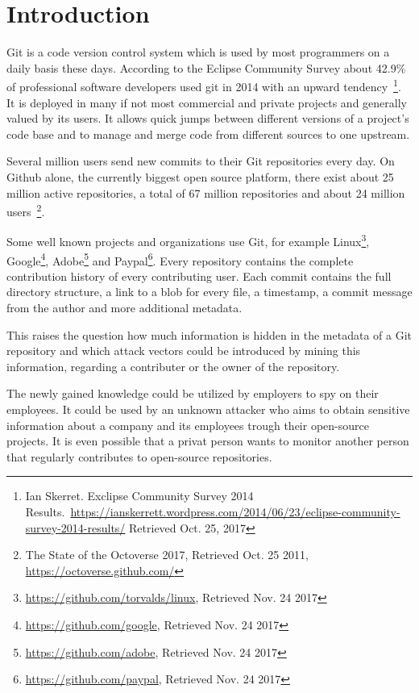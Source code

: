 \chapter{Introduction}

Git is a code version control system which is used by most programmers on a daily basis these days. According to the Eclipse Community Survey about 42.9\% of professional software developers used git in 2014 with an upward tendency~\footnote{Ian Skerret. Exclipse Community Survey 2014 Results.\ \url{https://ianskerrett.wordpress.com/2014/06/23/eclipse-community-survey-2014-results/} Retrieved Oct. 25, 2017}.
It is deployed in many if not most commercial and private projects and generally valued by its users. It allows quick jumps between different versions of a project's code base and to manage and merge code from different sources to one upstream.

Several million users send new commits to their Git repositories every day.
On Github alone, the currently biggest open source platform, there exist about 25 million active repositories, a total of 67 million repositories and about 24 million users~\footnote{The State of the Octoverse 2017, Retrieved Oct. 25 2011, \url{https://octoverse.github.com/}}.

Some well known projects and organizations use Git, for example Linux\footnote{\url{https://github.com/torvalds/linux}, Retrieved Nov. 24 2017}, Google\footnote{\url{https://github.com/google}, Retrieved Nov. 24 2017}, Adobe\footnote{\url{https://github.com/adobe}, Retrieved Nov. 24 2017} and Paypal\footnote{\url{https://github.com/paypal}, Retrieved Nov. 24 2017}.
Every repository contains the complete contribution history of every contributing user.
Each commit contains the full directory structure, a link to a blob for every file, a timestamp, a commit message from the author and more additional metadata.

This raises the question how much information is hidden in the metadata of a Git repository and which attack vectors could be introduced by mining this information, regarding a contributer or the owner of the repository.

The newly gained knowledge could be utilized by employers to spy on their employees.
It could be used by an unknown attacker who aims to obtain sensitive information about a company and its employees trough their open-source projects.
It is even possible that a privat person wants to monitor another person that regularly contributes to open-source repositories.

